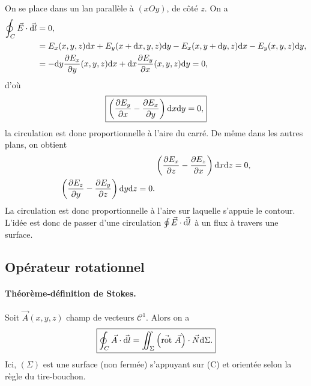         On se place dans un lan parallèle à $(xOy)$, de côté $z$. On a 
        \begin{align}
            \oint_{C}\vec{E}\cdot\vec{\mathrm{d} l}
            &=0,\\
            &=
            E_x(x,y,z)\mathrm{d} x+E_y(x+\mathrm{d} x,y,z)\mathrm{d} y -E_x(x,y+\mathrm{d} y,z)\mathrm{d} x-E_y(x,y,z)\mathrm{d} y,\\
            &=
            -\mathrm{d} y\frac{\partial E_x}{\partial y}(x,y,z)\mathrm{d} x+\mathrm{d} x\frac{\partial E_y}{\partial x}(x,y,z)\mathrm{d} y=0,
        \end{align}
        d'où
        \begin{equation}
            \boxed{
            \left(\frac{\partial E_y}{\partial x}-\frac{\partial E_x}{\partial y}\right)\mathrm{d} x\mathrm{d} y=0,}
        \end{equation}
        la circulation est donc proportionnelle à l'aire du carré. De même dans les autres plans, on obtient
        \begin{equation}
            \begin{aligned}
                &\left(\frac{\partial E_x}{\partial z}-\frac{\partial E_z}{\partial x}\right)\mathrm{d} x\mathrm{d} z=0,\\
                \left(\frac{\partial E_z}{\partial y}-\frac{\partial E_y}{\partial z}\right)\mathrm{d} y\mathrm{d} z=0.
            \end{aligned}
        \end{equation}
        La circulation est donc proportionnelle à l'aire sur laquelle s'appuie le contour. L'idée est donc de passer d'une circulation $\oint\vec{E}\cdot\vec{\mathrm{d} l}$ à un flux à travers une surface.

    \subsection{Opérateur rotationnel}

        \paragraph{Théorème-définition de Stokes.}

            Soit $\vec{A}(x,y,z)$ champ de vecteurs $\mathcal{C}^{1}$. Alors on a 
            \begin{equation}
                \boxed{
                    \oint_{C}\vec{A}\cdot\vec{\mathrm{d} l}=\iint_{\Sigma}\left(\vec{\mathrm{rot}}~\vec{A}\right)\cdot\vec{N}\mathrm{d}\Sigma.
                }
            \end{equation}
            Ici, $(\Sigma)$ est une surface (non fermée) s'appuyant sur (C) et orientée selon la règle du tire-bouchon.

